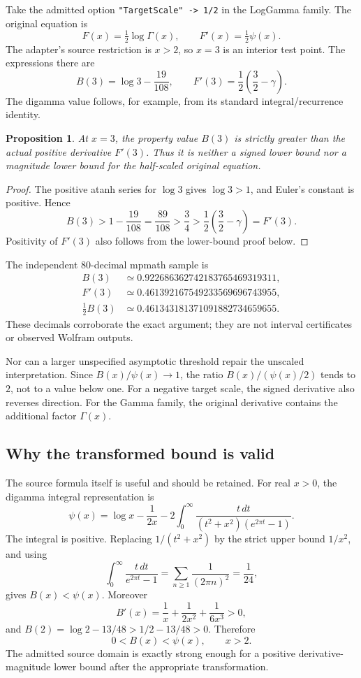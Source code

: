 \documentclass[11pt,letterpaper]{article}
\newcommand{\code}[1]{{\small\nolinkurl{#1}}}
\newtheorem{proposition}{Proposition}[section]
\begin{document}
Take the admitted option \code{"TargetScale" -> 1/2} in the LogGamma family. The original equation is
\[
 F(x)=\tfrac12\log\Gamma(x),\qquad F'(x)=\tfrac12\psi(x).
\]
The adapter's source restriction is $x>2$, so $x=3$ is an interior test point. The expressions there are
\[
 B(3)=\log3-\frac{19}{108},\qquad
 F'(3)=\frac12\left(\frac32-\gamma\right).
\]
The digamma value follows, for example, from its standard integral/recurrence identity.\cite{dlmf59}

\begin{proposition}
At $x=3$, the property value $B(3)$ is strictly greater than the actual positive derivative $F'(3)$. Thus it is neither a signed lower bound nor a magnitude lower bound for the half-scaled original equation.
\end{proposition}
\begin{proof}
The positive atanh series for $\log3$ gives $\log3>1$, and Euler's constant is positive. Hence
\[
 B(3)>1-\frac{19}{108}=\frac{89}{108}
 >\frac34>\frac12\left(\frac32-\gamma\right)=F'(3).
\]
Positivity of $F'(3)$ also follows from the lower-bound proof below.
\end{proof}

The independent 80-decimal mpmath sample is
\[
\begin{aligned}
 B(3)&\simeq0.922686362742183765469319311,\\
 F'(3)&\simeq0.461392167549233569696743955,\\
 \tfrac12B(3)&\simeq0.461343181371091882734659655.
\end{aligned}
\]
These decimals corroborate the exact argument; they are not interval certificates or observed Wolfram outputs.

Nor can a larger unspecified asymptotic threshold repair the unscaled interpretation. Since $B(x)/\psi(x)\to1$, the ratio $B(x)/(\psi(x)/2)$ tends to $2$, not to a value below one. For a negative target scale, the signed derivative also reverses direction. For the Gamma family, the original derivative contains the additional factor $\Gamma(x)$.\cite{dlmf511}

\subsection{Why the transformed bound is valid}

The source formula itself is useful and should be retained. For real $x>0$, the digamma integral representation is\cite{dlmf59}
\[
 \psi(x)=\log x-\frac1{2x}
 -2\int_0^\infty
 \frac{t\,dt}{(t^2+x^2)(e^{2\pi t}-1)}.
\]
The integral is positive. Replacing $1/(t^2+x^2)$ by the strict upper bound $1/x^2$, and using
\[
 \int_0^\infty\frac{t\,dt}{e^{2\pi t}-1}
 =\sum_{n\ge1}\frac1{(2\pi n)^2}=\frac1{24},
\]
gives $B(x)<\psi(x)$. Moreover
\[
 B'(x)=\frac1x+\frac1{2x^2}+\frac1{6x^3}>0,
\]
and $B(2)=\log2-13/48>1/2-13/48>0$. Therefore
\begin{equation}
 0<B(x)<\psi(x),\qquad x>2.
 \label{eq:psiBound}
\end{equation}
The admitted source domain is exactly strong enough for a positive derivative-magnitude lower bound after the appropriate transformation.
\end{document}

